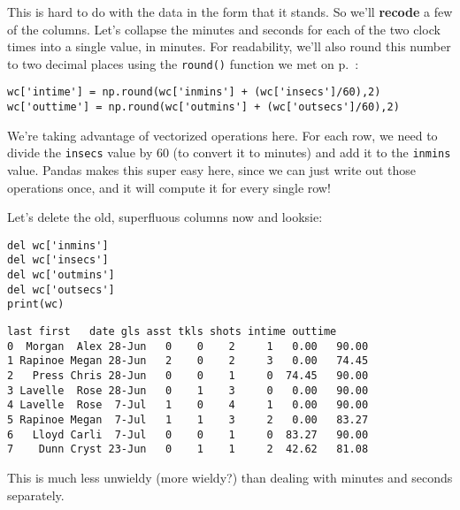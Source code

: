 
This is hard to do with the data in the form that it stands. So we'll
\textbf{recode} a few of the columns. Let's collapse the minutes and seconds
for each of the two clock times into a single value, in minutes. For
readability, we'll also round this number to two decimal places using the
\texttt{round()} function we met on p.~\pageref{round}:

\begin{Verbatim}[fontsize=\footnotesize,samepage=true,frame=single,framesep=3mm]
wc['intime'] = np.round(wc['inmins'] + (wc['insecs']/60),2)
wc['outtime'] = np.round(wc['outmins'] + (wc['outsecs']/60),2)
\end{Verbatim}


We're taking advantage of vectorized operations here. For each row, we need to
divide the \texttt{insecs} value by 60 (to convert it to minutes) and add it
to the \texttt{inmins} value. Pandas makes this super easy here, since we can
just write out those operations once, and it will compute it for every single
row!

\medskip
Let's delete the old, superfluous columns now and looksie:

\begin{Verbatim}[fontsize=\footnotesize,samepage=true,frame=single,framesep=3mm]
del wc['inmins']
del wc['insecs']
del wc['outmins']
del wc['outsecs']
print(wc)
\end{Verbatim}
\vspace{-.2in}

\begin{Verbatim}[fontsize=\footnotesize,samepage=true,frame=leftline,framesep=5mm,framerule=1mm]
     last first   date gls asst tkls shots intime outtime
0  Morgan  Alex 28-Jun   0    0    2     1   0.00   90.00
1 Rapinoe Megan 28-Jun   2    0    2     3   0.00   74.45
2   Press Chris 28-Jun   0    0    1     0  74.45   90.00
3 Lavelle  Rose 28-Jun   0    1    3     0   0.00   90.00
4 Lavelle  Rose  7-Jul   1    0    4     1   0.00   90.00
5 Rapinoe Megan  7-Jul   1    1    3     2   0.00   83.27
6   Lloyd Carli  7-Jul   0    0    1     0  83.27   90.00
7    Dunn Cryst 23-Jun   0    1    1     2  42.62   81.08
\end{Verbatim}

This is much less unwieldy (more wieldy?) than dealing with minutes and seconds
separately.

